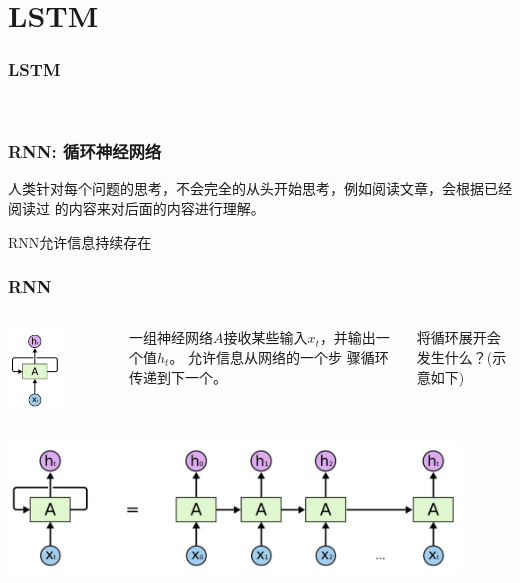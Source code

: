 \section{LSTM}
\begin{frame}[fragile]
  \frametitle{LSTM}
  ~
\end{frame}

\begin{frame}[fragile]
  \frametitle{RNN: 循环神经网络}

  人类针对每个问题的思考，不会完全的从头开始思考，例如阅读文章，会根据已经阅读过
  的内容来对后面的内容进行理解。

  RNN允许信息持续存在

  
\end{frame}

\begin{frame}[fragile]
  \frametitle{RNN}
  \begin{columns}[T]
    \includegraphics[width=0.6\textwidth]{figures/RNN-1.png}

    一组神经网络$A$接收某些输入$x_t$，并输出一个值$h_t$。 允许信息从网络的一个步
    骤循环传递到下一个。

    将循环展开会发生什么？(示意如下)
  \end{columns}

  \includegraphics[width=0.9\textwidth]{figures/RNN-2.png}
\end{frame}

